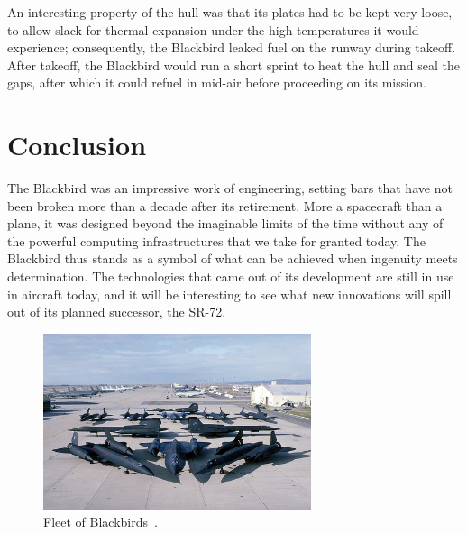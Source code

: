 \documentclass[12pt, draftclsnofoot, onecolumn]{IEEEtran}
\begin{document}
		An interesting property of the hull was that its plates had to be kept very loose, to allow slack for thermal expansion under the high temperatures it would experience; consequently, the Blackbird leaked fuel on the runway during takeoff. After takeoff, the Blackbird would run a short sprint to heat the hull and seal the gaps, after which it could refuel in mid-air before proceeding on its mission.

\section{Conclusion}

	The Blackbird was an impressive work of engineering, setting bars that have not been broken more than a decade after its retirement. More a spacecraft than a plane, it was designed beyond the imaginable limits of the time without any of the powerful computing infrastructures that we take for granted today. The Blackbird thus stands as a symbol of what can be achieved when ingenuity meets determination. The technologies that came out of its development are still in use in aircraft today, and it will be interesting to see what new innovations will spill out of its planned successor, the SR-72.
	
\begin{figure}
	\centering
	\includegraphics[width=0.7\textwidth]{fleet}
	\caption{Fleet of Blackbirds~\cite{flickr}.}
\end{figure}

{}

\end{document}

